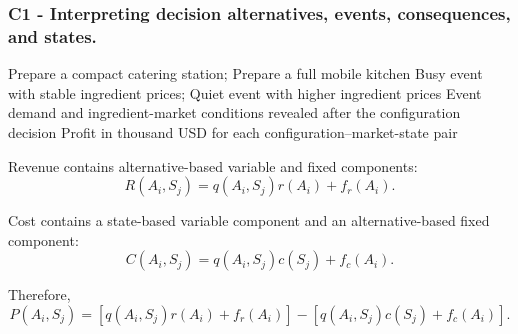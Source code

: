 	\subsubsection*{C1 - Interpreting decision alternatives, events, consequences, and states.}
	\label{subsec:problem10-mobile-catering-configuration-c1}

	\DecisionElementsTable
	{Prepare a compact catering station; Prepare a full mobile kitchen}
	{Busy event with stable ingredient prices; Quiet event with higher ingredient prices}
	{Event demand and ingredient-market conditions revealed after the configuration decision}
	{Profit in thousand USD for each configuration--market-state pair}

	Revenue contains alternative-based variable and fixed components:
	\[
	R(A_i,S_j)
	=
	q(A_i,S_j)r(A_i)+f_r(A_i).
	\]

	Cost contains a state-based variable component and an alternative-based
	fixed component:
	\[
	C(A_i,S_j)
	=
	q(A_i,S_j)c(S_j)+f_c(A_i).
	\]

	Therefore,
	\[
	P(A_i,S_j)
	=
	\left[
	q(A_i,S_j)r(A_i)+f_r(A_i)
	\right]
	-
	\left[
	q(A_i,S_j)c(S_j)+f_c(A_i)
	\right].
	\]


